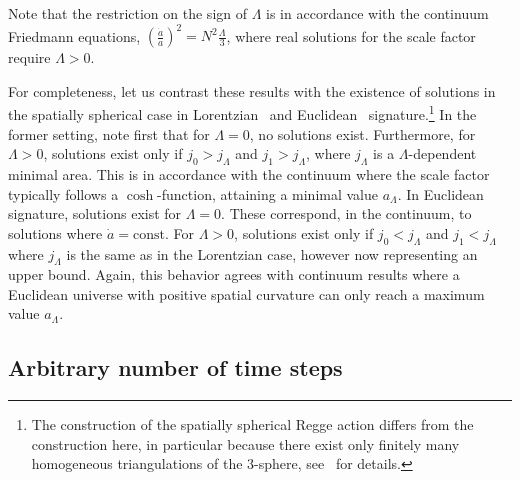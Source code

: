 \documentclass[amsmath,amssymb,aps,twocolumn,superscriptaddress,nofootinbib]{revtex4-1}
\begin{document}
Note that the restriction on the sign of $\Lambda$ is in accordance with the continuum Friedmann equations, $\left(\frac{\dot{a}}{a}\right)^2 = N^2\frac{\Lambda}{3}$, where real solutions for the scale factor require $\Lambda > 0$. 

For completeness, let us contrast these results with the existence of solutions in the spatially spherical case in Lorentzian~\cite{Dittrich:2021gww} and Euclidean~\cite{Hilpert2024,Collins:1973hw} signature.\footnote{The construction of the spatially spherical Regge action differs from the construction here, in particular because there exist only finitely many homogeneous triangulations of the $3$-sphere, see~\cite{Collins:1973hw,Dittrich:2021gww} for details.} 
In the former setting, note first that for $\Lambda = 0$, no solutions exist. 
Furthermore, for $\Lambda > 0$, solutions exist only if $j_0 > j_\Lambda$ and $j_1 > j_\Lambda$, where $j_\Lambda$ is a $\Lambda$-dependent minimal area. 
This is in accordance with the continuum where the scale factor typically follows a $\cosh$-function, attaining a minimal value $a_\Lambda$.
In Euclidean signature, solutions exist for $\Lambda = 0$. 
These correspond, in the continuum, to solutions where $\dot{a} = \mathrm{const}$.
For $\Lambda > 0$, solutions exist only if $j_0 < j_\Lambda$ and $j_1<j_\Lambda$ where $j_\Lambda$ is the same as in the Lorentzian case, however now representing an upper bound. 
Again, this behavior agrees with continuum results where a Euclidean universe with positive spatial curvature can only reach a maximum value $a_\Lambda$.
 
\subsection{Arbitrary number of time steps}\label{sec:more time steps}
\end{document}
